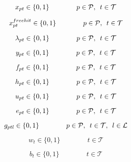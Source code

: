 \begin{equation} \label{eq:bin_x}
    x_{pt} \in \{0,1\} \qquad\qquad p \in \mathcal{P}, \enskip t \in \mathcal{T}
\end{equation}

\begin{equation} \label{eq:free_hit_bin_x}
    x^{free hit}_{pt} \in \{0,1\} \qquad\qquad p \in \mathcal{P}, \enskip t \in \mathcal{T}
\end{equation}

\begin{equation} \label{eq:auxiliary_variable_binary}
    \lambda_{pt} \in \{0,1\} \qquad\qquad p \in \mathcal{P}, \enskip t \in \mathcal{T}
\end{equation}

\begin{equation} \label{eq:bin_y}
    y_{pt} \in \{0,1\} \qquad\qquad p \in \mathcal{P}, \enskip t \in \mathcal{T}
\end{equation}

\begin{equation} \label{eq:bin_f}
    f_{pt} \in \{0,1\} \qquad\qquad p \in \mathcal{P}, \enskip t \in \mathcal{T}
\end{equation}

\begin{equation} \label{eq:bin_h}
    h_{pt} \in \{0,1\} \qquad\qquad p \in \mathcal{P}, \enskip t \in \mathcal{T}
\end{equation}
 
\begin{equation} \label{eq:bin_u}
    u_{pt} \in \{0,1\} \qquad\qquad p \in \mathcal{P}, \enskip t \in \mathcal{T} 
\end{equation}

\begin{equation} \label{eq:nonn_e}
    e_{pt} \in \{0,1\} \qquad\qquad p \in \mathcal{P}, \enskip t \in \mathcal{T} 
\end{equation}

\begin{equation} \label{eq:binf_g}
    g_{ptl} \in \{0,1\} \qquad\qquad p \in \mathcal{P}, \enskip t \in \mathcal{T},\enskip l \in \mathcal{L}
\end{equation}

\begin{equation} \label{eq:wildcard_bin_w}
    w_{t} \in \{0,1\} \qquad\qquad  t \in \mathcal{T}
\end{equation}

\begin{equation} \label{eq:bench_boost_bin_b}
    b_{t} \in \{0,1\} \qquad\qquad  t \in \mathcal{T}
\end{equation}

